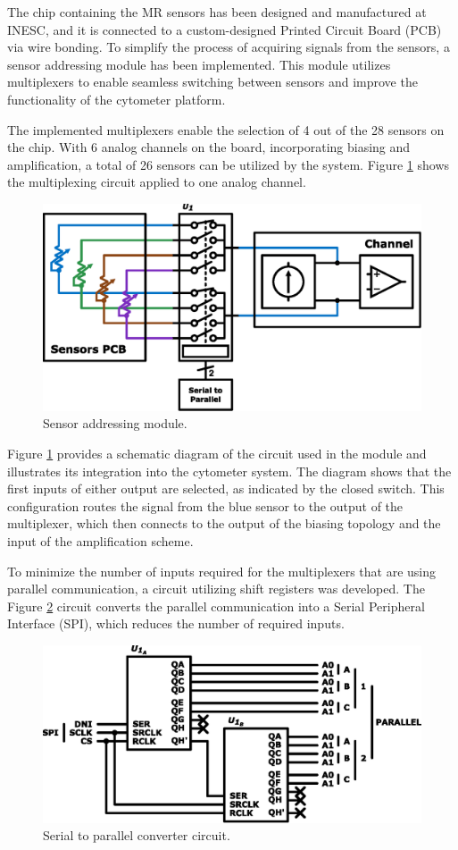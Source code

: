 The chip containing the MR sensors has been designed and manufactured at INESC, and it is connected to a custom-designed Printed Circuit Board (PCB) via wire bonding. To simplify the process of acquiring signals from the sensors, a sensor addressing module has been implemented. This module utilizes multiplexers to enable seamless switching between sensors and improve the functionality of the cytometer platform.

The implemented multiplexers enable the selection of 4 out of the 28 sensors on the chip. With 6 analog channels on the board, incorporating biasing and amplification, a total of 26 sensors can be utilized by the system. Figure \ref{fig:sensormux} shows the multiplexing circuit applied to one analog channel.

\begin{figure}[!ht]
    \centering
    \includegraphics[width=.475\textwidth]{figs/sensormux.eps}
    \caption{Sensor addressing module.}
    \label{fig:sensormux}
\end{figure}

Figure \ref{fig:sensormux} provides a schematic diagram of the circuit used in the module and illustrates its integration into the cytometer system. The diagram shows that the first inputs of either output are selected, as indicated by the closed switch. This configuration routes the signal from the blue sensor to the output of the multiplexer, which then connects to the output of the biasing topology and the input of the amplification scheme.

To minimize the number of inputs required for the multiplexers that are using parallel communication, a circuit utilizing shift registers was developed. The Figure \ref{fig:s2p} circuit converts the parallel communication into a Serial Peripheral Interface (SPI), which reduces the number of required inputs.

\begin{figure}[!ht]
    \centering
    \includegraphics[width=.475\textwidth]{figs/s2p.eps}
    \caption{Serial to parallel converter circuit.}
    \label{fig:s2p}
\end{figure}

